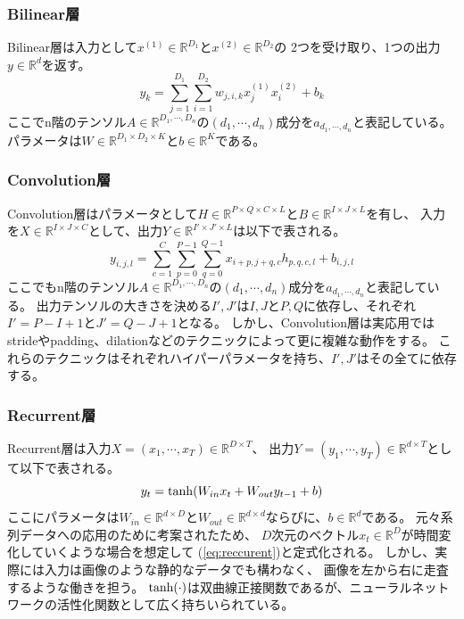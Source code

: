 \subsubsection{\rm Bilinear\mc 層}
Bilinear層は入力として\(x^{(1)}\in \mathbb R^{D_1}\)と\(x^{(2)}\in \mathbb R^{D_2}\)の
2つを受け取り、1つの出力\(y \in \mathbb R^d\)を返す。
\begin{equation}
    y_k = \sum_{j=1}^{D_1}\sum_{i=1}^{D_2}w_{j,i,k}x_j^{(1)}x_i^{(2)} + b_k
\end{equation}
ここでn階のテンソル\(A\in \mathbb R^{D_1,\cdots ,D_n}\)の\((d_1,\cdots,d_n)\)成分を\(a_{d_1,\cdots,d_n}\)と表記している。
パラメータは\(W\in \mathbb R^{D_1\times D_2 \times K}\)と\(b \in \mathbb R^K\)である。

\subsubsection{\rm Convolution\mc 層}
Convolution層はパラメータとして\(H \in \mathbb R^{P\times Q\times C\times L}\)と\(B \in \mathbb R^{I\times J\times L}\)を有し、
入力を\(X \in \mathbb R^{I\times J\times C}\)として、出力\(Y \in \mathbb R^{I'\times J'\times L}\)は以下で表される。
\begin{equation}
    y_{i,j,l} = \sum_{c=1}^C \sum_{p=0}^{P-1} \sum_{q=0}^{Q-1}x_{i+p,j+q,c}h_{p,q,c,l}+b_{i,j,l}
    \label{eq:convlayer}
\end{equation}
ここでもn階のテンソル\(A\in \mathbb R^{D_1,\cdots ,D_n}\)の\((d_1,\cdots,d_n)\)成分を\(a_{d_1,\cdots,d_n}\)と表記している。
出力テンソルの大きさを決める\(I',J'\)は\(I,J\)と\(P,Q\)に依存し、それぞれ\(I'=P-I+1\)と\(J'=Q-J+1\)となる。
しかし、Convolution層は実応用ではstrideやpadding、dilationなどのテクニックによって更に複雑な動作をする。
これらのテクニックはそれぞれハイパーパラメータを持ち、\(I',J'\)はその全てに依存する。

\subsubsection{\rm Recurrent\mc 層}
Recurrent層は入力\(X = (x_1,\cdots,x_T)\in \mathbb R^{D \times T}\)、
出力\(Y = (y_1,\cdots,y_T)\in \mathbb R^{d \times T}\)として以下で表される。
\begin{equation}
    y_t = {\rm tanh}(W_{in}x_t + W_{out}y_{t-1} + b) 
    \label{eq:reccurent}
\end{equation}
ここにパラメータは\(W_{in} \in \mathbb R^{d \times D}\)と\(W_{out} \in \mathbb R^{d \times d}\)ならびに、\(b \in \mathbb R^d \)である。
元々系列データへの応用のために考案されたため、
\(D\)次元のベクトル\(x_t \in \mathbb R^D\)が時間変化していくような場合を想定して
(\ref{eq:reccurent})と定式化される。
しかし、実際には入力は画像のような静的なデータでも構わなく、
画像を左から右に走査するような働きを担う。
\(\rm tanh(\cdot)\)は双曲線正接関数であるが、ニューラルネットワークの活性化関数として広く持ちいられている。

